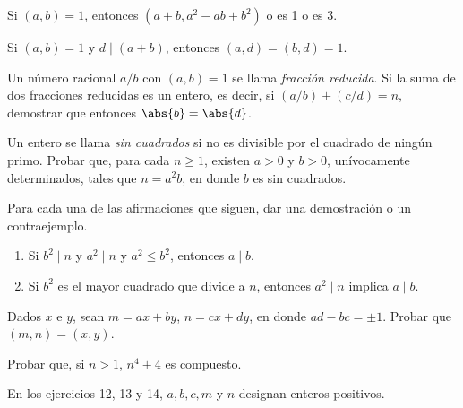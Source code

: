 \documentclass[12pt,a4paper]{book}
\begin{document}
    \begin{ejercicio}
        Si $(a,b)=1$, entonces $(a+b,a^{2}-ab+b^{2})$ o es 1 o es 3.
    \end{ejercicio}

    \begin{ejercicio}
        Si $(a,b)=1$ y $d\mid(a+b)$, entonces $(a,d)=(b,d)=1$.
    \end{ejercicio}

    \begin{ejercicio}
        Un número racional $a/b$ con $(a,b)=1$ se llama \textit{fracción reducida}. Si la
        suma de dos fracciones reducidas es un entero, es decir, si $(a/b)+(c/d)=n$,
        demostrar que entonces $\abs{b}=\abs{d}$.
    \end{ejercicio}

    \begin{ejercicio}
        Un entero se llama \textit{sin cuadrados} si no es divisible por el cuadrado de
        ningún primo. Probar que, para cada $n\geq1$, existen $a>0$ y $b>0$, unívocamente
        determinados, tales que $n=a^{2}b$, en donde $b$ es sin cuadrados.
    \end{ejercicio}

    \begin{ejercicio}
        Para cada una de las afirmaciones que siguen, dar una demostración o un
        contraejemplo.
        \begin{enumerate}
            \item[(a)] Si $b^{2}\mid n$ y $a^{2}\mid n$ y $a^{2}\leq b^{2}$, entonces $a\mid b$.
            \item[(b)] Si $b^{2}$ es el mayor cuadrado que divide a $n$, entonces $a^{2}\mid n$
            implica $a\mid b$.
        \end{enumerate}
    \end{ejercicio}

    \begin{ejercicio}
        Dados $x$ e $y$, sean $m=ax+by$, $n=cx+dy$, en donde $ad-bc=\pm1$. Probar que
        $(m,n)=(x,y)$.
    \end{ejercicio}

    \begin{ejercicio}
        Probar que, si $n>1$, $n^{4}+4$ es compuesto.
    \end{ejercicio}

    En los ejercicios 12, 13 y 14, $a,b,c,m$ y $n$ designan enteros positivos.
\end{document}
